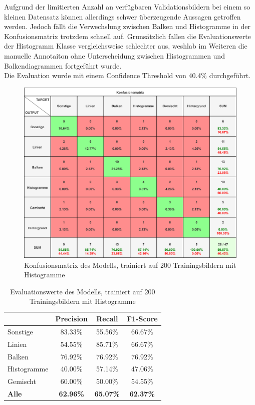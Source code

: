 Aufgrund der limitierten Anzahl an verfügbaren Validationsbildern bei einem so kleinen Datensatz können allerdings schwer überzeugende Aussagen getroffen werden.
Jedoch fällt die Verwechslung zwischen Balken und Histogramme in der Konfusionsmatrix trotzdem schnell auf. Grunsätzlich fallen die Evaluationswerte der Histogramm Klasse vergleichsweise schlechter aus, weshlab im Weiteren die manuelle Annotaiton ohne Unterscheidung zwischen Histogrammen und Balkendiagrammen fortgeführt wurde.
\\
Die Evaluation wurde mit einem Confidence Threshold von 40.4\% durchgeführt.
\begin{figure}[H]
    \centering
    \captionsetup{width=1\linewidth}
    \includegraphics[width=1\textwidth]{Experimente/img/detect/1_val@0.404_200_histo/konfusionsmatrix.png}
    \caption{ Konfusionsmatrix des Modells, trainiert auf 200 Trainingsbildern mit Histogramme}
    \label{fig:extraction_output}
\end{figure}

\begin{table}[H]
    \centering
    \begin{tabular}{|l|c|c|c|}
        \hline
        \rowcolor[HTML]{EFEFEF}
                      & Precision        & Recall           & F1-Score         \\ \hline
        Sonstige      & 83.33\%          & 55.56\%          & 66.67\%          \\ \hline
        Linien        & 54.55\%          & 85.71\%          & 66.67\%          \\ \hline
        Balken        & 76.92\%          & 76.92\%          & 76.92\%          \\ \hline
        Histogramme   & 40.00\%          & 57.14\%          & 47.06\%          \\ \hline
        Gemischt      & 60.00\%          & 50.00\%          & 54.55\%          \\ \hline
        \textbf{Alle} & \textbf{62.96\%} & \textbf{65.07\%} & \textbf{62.37\%} \\ \hline
    \end{tabular}
    \caption{Evaluationswerte des Modells, trainiert auf 200 Trainingsbildern mit Histogramme}
\end{table}


